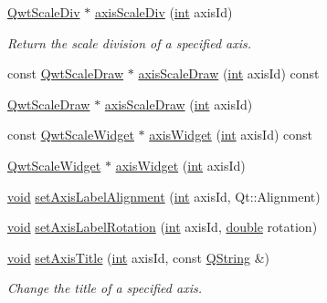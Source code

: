 \begin{DoxyCompactItemize}
\hyperlink{class_qwt_scale_div}{Qwt\-Scale\-Div} $\ast$ \hyperlink{class_qwt_plot_af20f32c68fdd8ae4adfeabf21eb6068b}{axis\-Scale\-Div} (\hyperlink{ioapi_8h_a787fa3cf048117ba7123753c1e74fcd6}{int} axis\-Id)
\begin{DoxyCompactList}\small\item\em Return the scale division of a specified axis. \end{DoxyCompactList}\item 
const \hyperlink{class_qwt_scale_draw}{Qwt\-Scale\-Draw} $\ast$ \hyperlink{class_qwt_plot_a2ff0d0733c0ce8bb275cfde23bf9736c}{axis\-Scale\-Draw} (\hyperlink{ioapi_8h_a787fa3cf048117ba7123753c1e74fcd6}{int} axis\-Id) const 
\item 
\hyperlink{class_qwt_scale_draw}{Qwt\-Scale\-Draw} $\ast$ \hyperlink{class_qwt_plot_abbb49f1730c3ea9f636c032f81e5a87e}{axis\-Scale\-Draw} (\hyperlink{ioapi_8h_a787fa3cf048117ba7123753c1e74fcd6}{int} axis\-Id)
\item 
const \hyperlink{class_qwt_scale_widget}{Qwt\-Scale\-Widget} $\ast$ \hyperlink{class_qwt_plot_a6b495d9b17962be6e098026441a1f7b8}{axis\-Widget} (\hyperlink{ioapi_8h_a787fa3cf048117ba7123753c1e74fcd6}{int} axis\-Id) const 
\item 
\hyperlink{class_qwt_scale_widget}{Qwt\-Scale\-Widget} $\ast$ \hyperlink{class_qwt_plot_ae3386e1d38f70864c4c019c0eb6a3d9d}{axis\-Widget} (\hyperlink{ioapi_8h_a787fa3cf048117ba7123753c1e74fcd6}{int} axis\-Id)
\item 
\hyperlink{group___u_a_v_objects_plugin_ga444cf2ff3f0ecbe028adce838d373f5c}{void} \hyperlink{class_qwt_plot_a19f1b67fa79b80c712cf5f52b97ea0c5}{set\-Axis\-Label\-Alignment} (\hyperlink{ioapi_8h_a787fa3cf048117ba7123753c1e74fcd6}{int} axis\-Id, Qt\-::\-Alignment)
\item 
\hyperlink{group___u_a_v_objects_plugin_ga444cf2ff3f0ecbe028adce838d373f5c}{void} \hyperlink{class_qwt_plot_ad5fa7aa01c88eab38ad64b131584f977}{set\-Axis\-Label\-Rotation} (\hyperlink{ioapi_8h_a787fa3cf048117ba7123753c1e74fcd6}{int} axis\-Id, \hyperlink{_super_l_u_support_8h_a8956b2b9f49bf918deed98379d159ca7}{double} rotation)
\item 
\hyperlink{group___u_a_v_objects_plugin_ga444cf2ff3f0ecbe028adce838d373f5c}{void} \hyperlink{class_qwt_plot_a5d60f1836e05e5cc5c7fe9570d6a608a}{set\-Axis\-Title} (\hyperlink{ioapi_8h_a787fa3cf048117ba7123753c1e74fcd6}{int} axis\-Id, const \hyperlink{group___u_a_v_objects_plugin_gab9d252f49c333c94a72f97ce3105a32d}{Q\-String} \&)
\begin{DoxyCompactList}\small\item\em Change the title of a specified axis. \end{DoxyCompactList}\item 

\end{DoxyCompactItemize}
